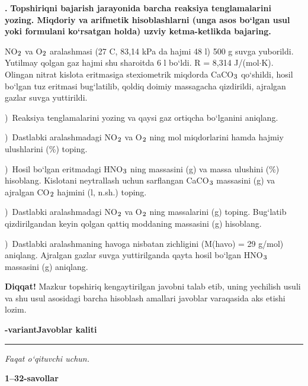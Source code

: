 \documentclass[11pt,a4paper]{article}
\renewcommand{\textsubscript}[1]{\ensuremath{_{\text{\fontsize{8}{8}\selectfont #1}}}}
\newcommand{\qn}[1]{\textbf{\fontsize{11.5}{13}\selectfont #1}}
\newcommand{\qsep}{\par\vspace{13pt}}
\newcommand{\diqqat}[1]{\par\smallskip\noindent\textbf{Diqqat!} #1\par\medskip}
\begin{document}
\noindent\qn{43.} \textbf{Topshiriqni bajarish jarayonida barcha reaksiya tenglamalarini yozing. Miqdoriy va arifmetik hisoblashlarni (unga asos bo`lgan usul yoki formulani ko`rsatgan holda) uzviy ketma-ketlikda bajaring.}\par\smallskip
NO\textsubscript{2} va O\textsubscript{2} aralashmasi (27 \textdegree{}C, 83,14 kPa da hajmi 48 l) 500 g suvga yuborildi. Yutilmay qolgan gaz hajmi shu sharoitda 6 l bo`ldi. R = 8,314 J/(mol$\cdot$K). Olingan nitrat kislota eritmasiga stexiometrik miqdorda CaCO\textsubscript{3} qo`shildi, hosil bo`lgan tuz eritmasi bug`latilib, qoldiq doimiy massagacha qizdirildi, ajralgan gazlar suvga yuttirildi.\par
{})\ Reaksiya tenglamalarini yozing va qaysi gaz ortiqcha bo`lganini aniqlang.\par
{})\ Dastlabki aralashmadagi NO\textsubscript{2} va O\textsubscript{2} ning mol miqdorlarini hamda hajmiy ulushlarini (\%) toping.\par
{})\ Hosil bo`lgan eritmadagi HNO\textsubscript{3} ning massasini (g) va massa ulushini (\%) hisoblang. Kislotani neytrallash uchun sarflangan CaCO\textsubscript{3} massasini (g) va ajralgan CO\textsubscript{2} hajmini (l, n.sh.) toping.\par
{})\ Dastlabki aralashmadagi NO\textsubscript{2} va O\textsubscript{2} ning massalarini (g) toping. Bug`latib qizdirilgandan keyin qolgan qattiq moddaning massasini (g) hisoblang.\par
{})\ Dastlabki aralashmaning havoga nisbatan zichligini (M(havo) = 29 g/mol) aniqlang. Ajralgan gazlar suvga yuttirilganda qayta hosil bo`lgan HNO\textsubscript{3} massasini (g) aniqlang.\par
\diqqat{Mazkur topshiriq kengaytirilgan javobni talab etib, uning yechilish usuli va shu usul asosidagi barcha hisoblash amallari javoblar varaqasida aks etishi lozim.}\qsep
\newpage
\noindent\textbf{\fontsize{13}{15}-variant}\hfill \textbf{Javoblar kaliti}\par\smallskip\hrule\smallskip
\textit{Faqat o`qituvchi uchun.}\par\medskip
\noindent\textbf{1--32-savollar}\par\smallskip
\end{document}
